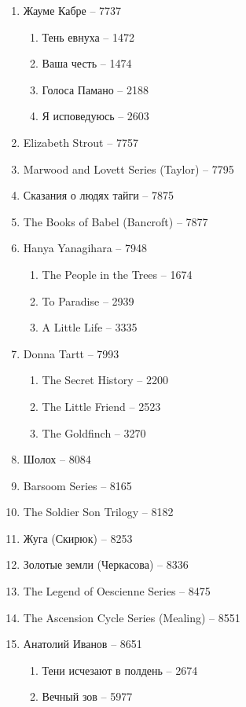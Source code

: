 \documentclass[a4paper, 11pt]{proc} %
\begin{document}
\begin{enumerate}
    \item Жауме Кабре -- 7737
        \begin{enumerate}
            \item Тень евнуха -- 1472
            \item Ваша честь -- 1474
            \item Голоса Памано -- 2188
            \item Я исповедуюсь -- 2603
        \end{enumerate}
    \item Elizabeth Strout -- 7757
    \item Marwood and Lovett Series (Taylor) -- 7795
    \item Сказания о людях тайги -- 7875
    \item The Books of Babel (Bancroft) -- 7877
    \item Hanya Yanagihara -- 7948
        \begin{enumerate}
            \item The People in the Trees -- 1674
            \item To Paradise -- 2939
            \item A Little Life -- 3335
        \end{enumerate}
    \item Donna Tartt -- 7993
        \begin{enumerate}
            \item The Secret History -- 2200
            \item The Little Friend -- 2523
            \item The Goldfinch -- 3270
        \end{enumerate}
    \item Шолох -- 8084
    \item Barsoom Series -- 8165
    \item The Soldier Son Trilogy -- 8182
    \item Жуга (Скирюк) -- 8253
    \item Золотые земли (Черкасова) -- 8336
    \item The Legend of Oescienne Series -- 8475
    \item The Ascension Cycle Series (Mealing) -- 8551
    \item Анатолий Иванов -- 8651
        \begin{enumerate}
            \item Тени исчезают в полдень -- 2674
            \item Вечный зов -- 5977

\end{enumerate}
\end{enumerate}
\end{document}
